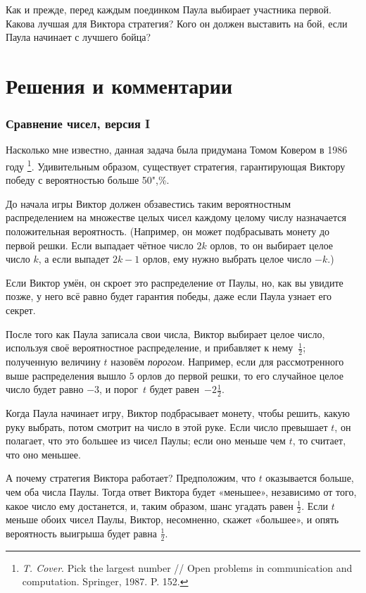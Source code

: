 \documentclass[twoside]{book}
\begin{document}

Как и прежде, перед каждым поединком Паула выбирает участника первой.
Какова лучшая для Виктора стратегия? Кого он должен выставить на бой, если Паула начинает с лучшего бойца?


\section*{Решения и комментарии}

\subsubsection*{Сравнение чисел, версия I}%

Насколько мне известно, данная задача была придумана Томом Ковером %
в 1986 году%
\footnote{\emph{T. Cover}. Pick the largest number /\!/ {Open problems in communication and computation.} Springer, 1987. P. 152.}.
Удивительным образом, существует стратегия, гарантирующая Виктору победу с вероятностью больше 50",\%.


До начала игры Виктор должен обзавестись таким вероятностным распределением на множестве целых чисел каждому целому числу назначается положительная вероятность.
(Например, он может подбрасывать монету до первой решки.
Если выпадает чётное число $2k$ орлов, то он выбирает целое число $k$, а если выпадет $2k-1$ орлов, ему нужно выбрать целое число $-k$.)

Если Виктор умён, он скроет это распределение от Паулы, но, как вы увидите позже, у него всё равно будет гарантия победы, даже если Паула узнает его секрет.

После того как Паула записала свои числа, Виктор выбирает целое число, используя своё вероятностное распределение, и прибавляет к нему~$\tfrac12$;
полученную величину $t$ назовём \emph{порогом}.
Например, если для рассмотренного выше распределения вышло $5$ орлов до первой решки, то его случайное целое число будет равно $-3$, и порог~$t$ будет равен~$-2 \tfrac12$.


Когда Паула начинает игру, Виктор подбрасывает монету, чтобы решить, какую руку выбрать, потом смотрит на число в этой руке.
Если число превышает $t$, он полагает, что это большее из чисел Паулы; если оно меньше чем $t$, то считает, что оно меньшее.

А почему стратегия Виктора работает? 
Предположим, что $t$ оказывается больше, чем оба числа Паулы.
Тогда ответ Виктора будет «меньшее», независимо от того, какое число ему достанется, и, таким образом, шанс угадать равен $\tfrac12$.
Если $t$ меньше обоих чисел Паулы, Виктор, несомненно, скажет «большее», и опять вероятность выигрыша будет равна $\tfrac12$.
\end{document}
